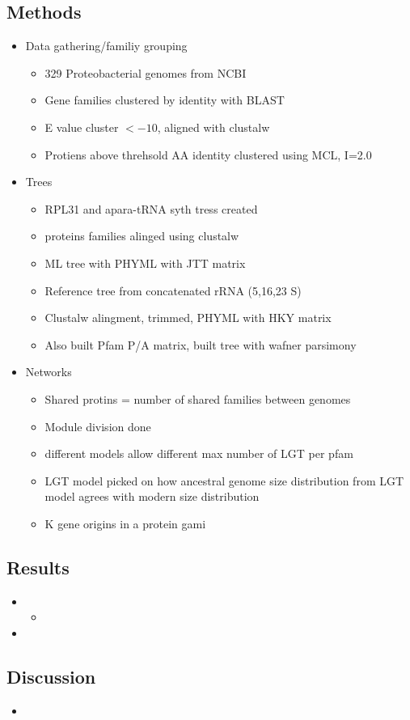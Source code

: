 \documentclass[10pt,letter]{article}
\begin{document}
\subsection*{Methods}
\begin{itemize}
    \item Data gathering/familiy grouping
    \begin{itemize}
        \item 329 Proteobacterial genomes from NCBI
        \item Gene families clustered by identity with BLAST
        \item E value cluster $< -10$, aligned with clustalw
        \item Protiens above threhsold AA identity clustered using MCL, I=2.0
    \end{itemize}
    \item Trees
    \begin{itemize}
        \item RPL31 and apara-tRNA syth tress created
        \item proteins families alinged using clustalw
        \item ML tree with PHYML with JTT matrix
        \item Reference tree from concatenated rRNA (5,16,23 S)
        \item Clustalw alingment, trimmed, PHYML with HKY matrix
        \item Also built Pfam P/A matrix, built tree with wafner parsimony
    \end{itemize}
    \item Networks
    \begin{itemize}
        \item Shared protins = number of shared families between genomes
        \item Module division done
        \item different models allow different max number of LGT per pfam
        \item LGT model picked on how ancestral genome size distribution from LGT model agrees with modern size distribution
        \item K gene origins in a protein gami
    \end{itemize}
\end{itemize}
\subsection*{Results}
\begin{itemize}
    \item
    \begin{itemize}
        \item
    \end{itemize}
    \item
\end{itemize}
\subsection*{Discussion}
\begin{itemize}
    \item
\end{itemize}
\printbibliography
\end{document}
